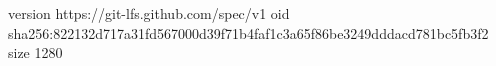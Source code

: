 version https://git-lfs.github.com/spec/v1
oid sha256:822132d717a31fd567000d39f71b4faf1c3a65f86be3249dddacd781bc5fb3f2
size 1280
